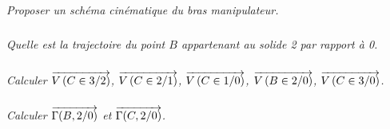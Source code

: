 \documentclass[10pt,oneside]{article}
\begin{document}
\subparagraph{}
\textit{Proposer un schéma cinématique du bras manipulateur.}

\subparagraph{}
\textit{Quelle est la trajectoire du point $B$ appartenant au solide 2 par rapport à 0.}

\subparagraph{}
\textit{Calculer $\overrightarrow{V\left( {C} \in {3}/{2}\right)}$, $\overrightarrow{V\left( {C} \in {2}/{1}\right)}$, $\overrightarrow{V\left( {C} \in {1}/{0}\right)}$, $\overrightarrow{V\left( {B} \in {2}/{0}\right)}$, $\overrightarrow{V\left( {C} \in {3}/{0}\right)}$.}

\subparagraph{}
\textit{Calculer $\overrightarrow{\Gamma(B,2/0)}$ et $\overrightarrow{\Gamma(C,2/0)}$.}
\end{document}
